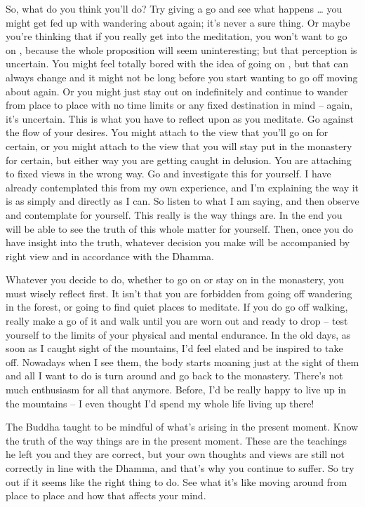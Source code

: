 So, what do you think you'll do? Try giving  a go and see what happens \ldots{} you might get fed up with wandering about again; it's never a sure thing. Or maybe you're thinking that if you really get into the meditation, you won't want to go on , because the whole proposition will seem uninteresting; but that perception is uncertain. You might feel totally bored with the idea of going on , but that can always change and it might not be long before you start wanting to go off moving about again. Or you might just stay out on  indefinitely and continue to wander from place to place with no time limits or any fixed destination in mind -- again, it's uncertain. This is what you have to reflect upon as you meditate. Go against the flow of your desires. You might attach to the view that you'll go on  for certain, or you might attach to the view that you will stay put in the monastery for certain, but either way you are getting caught in delusion. You are attaching to fixed views in the wrong way. Go and investigate this for yourself. I have already contemplated this from my own experience, and I'm explaining the way it is as simply and directly as I can. So listen to what I am saying, and then observe and contemplate for yourself. This really is the way things are. In the end you will be able to see the truth of this whole matter for yourself. Then, once you do have insight into the truth, whatever decision you make will be accompanied by right view and in accordance with the Dhamma. 

Whatever you decide to do, whether to go on  or stay on in the monastery, you must wisely reflect first. It isn't that you are forbidden from going off wandering in the forest, or going to find quiet places to meditate. If you do go off walking, really make a go of it and walk until you are worn out and ready to drop -- test yourself to the limits of your physical and mental endurance. In the old days, as soon as I caught sight of the mountains, I'd feel elated and be inspired to take off. Nowadays when I see them, the body starts moaning just at the sight of them and all I want to do is turn around and go back to the monastery. There's not much enthusiasm for all that anymore. Before, I'd be really happy to live up in the mountains -- I even thought I'd spend my whole life living up there! 

The Buddha taught to be mindful of what's arising in the present moment. Know the truth of the way things are in the present moment. These are the teachings he left you and they are correct, but your own thoughts and views are still not correctly in line with the Dhamma, and that's why you continue to suffer. So try out  if it seems like the right thing to do. See what it's like moving around from place to place and how that affects your mind.

